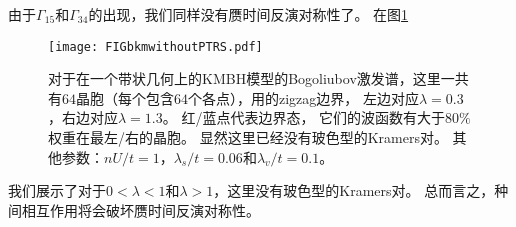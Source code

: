 由于$\Gamma_{15}$和$\Gamma_{34}$的出现，我们同样没有赝时间反演对称性了。
在图\ref{KMBHwithoutPTRS}%
\begin{figure}
	\texttt{[image: FIGbkmwithoutPTRS.pdf]}
	\caption{对于在一个带状几何上的KMBH模型的Bogoliubov激发谱，这里一共有$64$晶胞（每个包含$64$个各点），用的zigzag边界，
	左边对应$\lambda=0.3$，右边对应$\lambda=1.3$。
	红/蓝点代表边界态，
	它们的波函数有大于$80\%$权重在最左/右的晶胞。
	显然这里已经没有玻色型的Kramers对。
	其他参数：$nU/t=1$，$\lambda_s/t=0.06$和$\lambda_v/t=0.1$。}
	\label{KMBHwithoutPTRS}
\end{figure}
我们展示了对于$0<\lambda<1$和$\lambda>1$，这里没有玻色型的Kramers对。
总而言之，种间相互作用将会破坏赝时间反演对称性。







